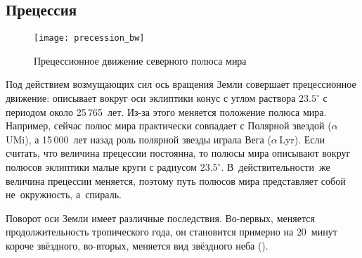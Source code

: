 \subsection{Прецессия}
\begin{wrapfigure}[15]{l}{0.41\tw}
    \vspace{-1pc}
    \centering
    \texttt{[image: precession\_bw]}
    \caption{Прецессионное движение северного полюса мира}
    \label{fig:precession-path}
\end{wrapfigure}
Под действием возмущающих сил ось вращения Земли совершает прецессионное движение: описывает вокруг оси эклиптики конус с углом раствора $23.5^\circ$ с периодом около  25\,765~лет. Из-за этого меняется положение полюса мира. Например, сейчас полюс мира практически совпадает с Полярной звездой ($\alpha$\,UMi), а 15\,000~лет назад роль полярной звезды играла Вега ($\alpha$\,Lyr). Если считать, что величина прецессии постоянна, то полюсы мира описывают вокруг полюсов эклиптики малые круги с радиусом $23.5^\circ$. В~действительности~же величина прецессии меняется, поэтому путь полюсов мира представляет собой не~окружность, а~спираль.

Поворот оси Земли имеет различные последствия. Во-первых, меняется продолжительность тропического года, он становится примерно на $20$~минут короче звёздного, во-вторых, меняется вид звёздного неба  ().
